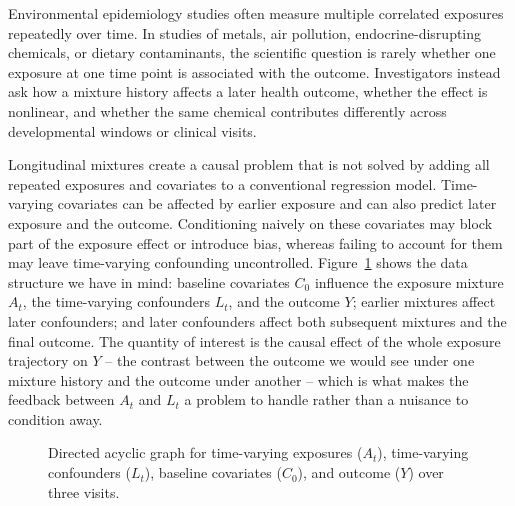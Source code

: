 \documentclass[11pt]{article}
\begin{document}
Environmental epidemiology studies often measure multiple correlated exposures repeatedly over time. In studies of metals, air pollution, endocrine-disrupting chemicals, or dietary contaminants, the scientific question is rarely whether one exposure at one time point is associated with the outcome. Investigators instead ask how a mixture history affects a later health outcome, whether the effect is nonlinear, and whether the same chemical contributes differently across developmental windows or clinical visits.

Longitudinal mixtures create a causal problem that is not solved by adding all repeated exposures and covariates to a conventional regression model. Time-varying covariates can be affected by earlier exposure and can also predict later exposure and the outcome. Conditioning naively on these covariates may block part of the exposure effect or introduce bias, whereas failing to account for them may leave time-varying confounding uncontrolled. Figure~\ref{fig:dag} shows the data structure we have in mind: baseline covariates $C_0$ influence the exposure mixture $A_t$, the time-varying confounders $L_t$, and the outcome $Y$; earlier mixtures affect later confounders; and later confounders affect both subsequent mixtures and the final outcome. The quantity of interest is the causal effect of the whole exposure trajectory on $Y$ -- the contrast between the outcome we would see under one mixture history and the outcome under another -- which is what makes the feedback between $A_t$ and $L_t$ a problem to handle rather than a nuisance to condition away.

\begin{figure}[h]
\centering
{}
\caption{Directed acyclic graph for time-varying exposures ($A_t$), time-varying confounders ($L_t$), baseline covariates ($C_0$), and outcome ($Y$) over three visits.}
\label{fig:dag}
\end{figure}
\end{document}
